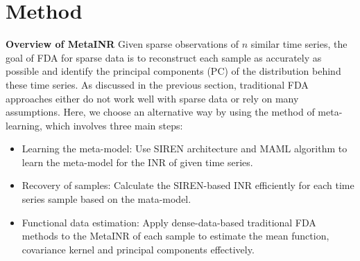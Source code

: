 \documentclass{article}
\begin{document}
\section{Method}


\textbf{Overview of MetaINR}
Given sparse observations of $n$ similar time series, the goal of FDA for sparse data is to reconstruct each sample as accurately as possible and identify the principal components (PC) of the distribution behind these time series.
As discussed in the previous section, traditional FDA approaches either do not work well with sparse data or rely on many assumptions.
Here, we choose an alternative way by using the method of meta-learning, which involves three main steps:



\begin{itemize}
  \item Learning the meta-model: Use SIREN architecture and MAML algorithm to learn the meta-model for the INR of given time series.
  \item Recovery of samples: Calculate the SIREN-based INR efficiently for each time series sample based on the mata-model.
  \item Functional data estimation: Apply dense-data-based traditional FDA methods to the MetaINR of each sample to estimate the mean function, covariance kernel and principal components effectively.
\end{itemize}
\end{document}
